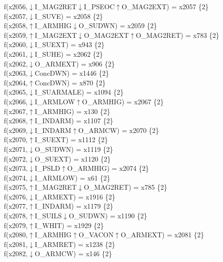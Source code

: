 f(x2056,$\downarrow$I\_MAG2RET$\downarrow$I\_PSEOC$\uparrow$O\_MAG2EXT) = x2057 \{2\} \\  
f(x2057,$\downarrow$I\_SUVE) = x2058 \{2\} \\  
f(x2058,$\uparrow$I\_ARMHIG$\downarrow$O\_SUDWN) = x2059 \{2\} \\  
f(x2059,$\uparrow$I\_MAG2EXT$\downarrow$O\_MAG2EXT$\uparrow$O\_MAG2RET) = x783 \{2\} \\  
f(x2060,$\downarrow$I\_SUEXT) = x943 \{2\} \\  
f(x2061,$\downarrow$I\_SUHE) = x2062 \{2\} \\  
f(x2062,$\downarrow$O\_ARMEXT) = x906 \{2\} \\  
f(x2063,$\downarrow$ConcDWN) = x1446 \{2\} \\  
f(x2064,$\uparrow$ConcDWN) = x870 \{2\} \\  
f(x2065,$\downarrow$I\_SUARMALE) = x1094 \{2\} \\  
f(x2066,$\downarrow$I\_ARMLOW$\uparrow$O\_ARMHIG) = x2067 \{2\} \\  
f(x2067,$\uparrow$I\_ARMHIG) = x130 \{2\} \\  
f(x2068,$\uparrow$I\_INDARM) = x1107 \{2\} \\  
f(x2069,$\downarrow$I\_INDARM$\uparrow$O\_ARMCW) = x2070 \{2\} \\  
f(x2070,$\uparrow$I\_SUEXT) = x1112 \{2\} \\  
f(x2071,$\downarrow$O\_SUDWN) = x1119 \{2\} \\  
f(x2072,$\downarrow$O\_SUEXT) = x1120 \{2\} \\  
f(x2073,$\downarrow$I\_PSLD$\uparrow$O\_ARMHIG) = x2074 \{2\} \\  
f(x2074,$\downarrow$I\_ARMLOW) = x61 \{2\} \\  
f(x2075,$\uparrow$I\_MAG2RET$\downarrow$O\_MAG2RET) = x785 \{2\} \\  
f(x2076,$\downarrow$I\_ARMEXT) = x1916 \{2\} \\  
f(x2077,$\uparrow$I\_INDARM) = x1179 \{2\} \\  
f(x2078,$\uparrow$I\_SUILS$\downarrow$O\_SUDWN) = x1190 \{2\} \\  
f(x2079,$\uparrow$I\_WHIT) = x1929 \{2\} \\  
f(x2080,$\uparrow$I\_ARMHIG$\uparrow$O\_VACON$\uparrow$O\_ARMEXT) = x2081 \{2\} \\  
f(x2081,$\downarrow$I\_ARMRET) = x1238 \{2\} \\  
f(x2082,$\downarrow$O\_ARMCW) = x146 \{2\} \\  

